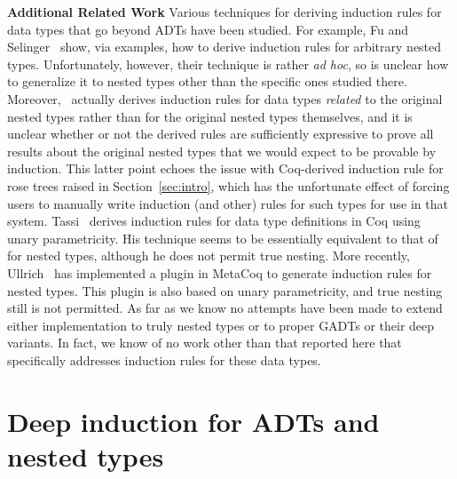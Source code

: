\documentclass[sigplan,10pt]{acmart}
\begin{document}
\vspace*{0.05in}

{\bf Additional Related Work\/} Various techniques for deriving
induction rules for data types that go beyond ADTs have been
studied. For example, Fu and Selinger~\cite{fs18} show, via examples,
how to derive induction rules for arbitrary nested
types. Unfortunately, however, their technique is rather {\em ad hoc},
so is unclear how to generalize it to nested types other than the
specific ones studied there. Moreover,~\cite{fs18} actually derives
induction rules for data types {\em related} to the original nested
types rather than for the original nested types themselves, and it is
unclear whether or not the derived rules are sufficiently expressive
to prove all results about the original nested types that we would
expect to be provable by induction. This latter point echoes the issue
with Coq-derived induction rule for rose trees raised in
Section~\ref{sec:intro}, which has the unfortunate effect of forcing
users to manually write induction (and other) rules for such types for
use in that system. Tassi~\cite{tas19} derives induction rules for
data type definitions in Coq using unary parametricity. His technique
seems to be essentially equivalent to that of~\cite{jp19} for nested
types, although he does not permit true nesting. More recently,
Ullrich~\cite{ull20} has implemented a plugin in MetaCoq to generate
induction rules for nested types. This plugin is also based on unary
parametricity, and true nesting still is not permitted.  As far as we
know no attempts have been made to extend either implementation to
truly nested types or to proper GADTs or their deep variants. In fact,
we know of no work other than that reported here that specifically
addresses induction rules for these data types.

\section{Deep induction for ADTs and nested types}\label{sec:ADTs-and-nesteds}
\end{document}
